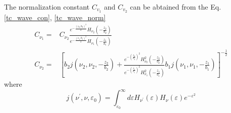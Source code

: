   The normalization constant $C_{v_1}$ and $C_{v_2}$ can be abtained from the Eq.\eqref{tc_wave_con}, \eqref{tc_wave_norm}
  \begin{align}
    C_{\nu_{1}}=&C_{\nu_{2}} \frac{e^{-\frac{\left(z_{2} / b_{2}\right)^{2} }{2}} H_{\nu_{2}}\left(-\frac{z_{2}}{b_{2}}\right)}{e^{-\frac{\left(z_{1} / b_{1}\right)^{2}}{2}} H_{\nu_{1}}\left(-\frac{z_{1}}{b_{1}}\right)}  \label{tc_Cv_1} \\
    C_{\nu_{2}}=&\left[b_{2} j\left(\nu_{2}, \nu_{2},-\frac{z_{2}}{b_{2}}\right)+\frac{e^{-\left(\frac{z_{2}}{b_{2}}\right)^{2}} H_{\nu_{2}}^{2}\left(-\frac{z_{2}}{b_{2}}\right)}{e^{-\left(\frac{z_{1}}{b_{1}}\right)^{2}} H_{\nu_{1}}^{2}\left(-\frac{z_{1}}{b_{1}}\right)} b_{1} j\left(\nu_{1}, \nu_{1},-\frac{z_{1}}{b_{1}}\right)\right]^{-\frac{1}{2}}  \label{tc_Cv_2}
  \end{align}
  where
  \begin{equation}
    j(\nu^\prime, \nu, \varepsilon_0) = \int_{\varepsilon_0}^{\infty} d\varepsilon H_{\nu^\prime}(\varepsilon) H_{\nu}(\varepsilon) e^{-\varepsilon^2}  \label{tc_j_func}
  \end{equation}
